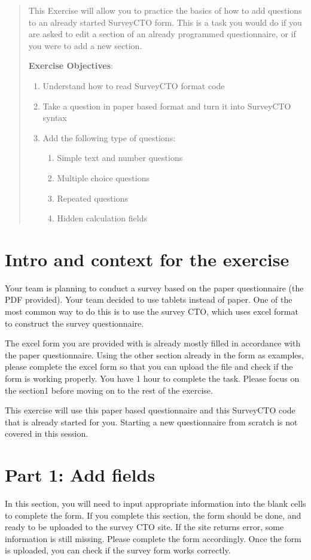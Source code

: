 \documentclass{tufte-handout}
\begin{document}
\begin{abstract}
This Exercise will allow you to practice the basics of how to add questions to an already started SurveyCTO form. This is a task you would do if you are asked to edit a section of an already programmed questionnaire, or if you were to add a new section.


\bigskip\noindent \textbf{Exercise Objectives}:
\begin{enumerate}
  \item Understand how to read SurveyCTO format code
  \item Take a question in paper based format and turn it into SurveyCTO syntax
  \item Add the following type of questions:
  \begin{enumerate}
  	\item Simple text and number questions
  	\item Multiple choice questions
  	\item Repeated questions
	\item Hidden calculation fields
  \end{enumerate}
\end{enumerate}
\end{abstract}

\section{Intro and context for the exercise}

Your team is planning to conduct a survey based on the paper questionnaire (the PDF provided). Your team decided to use tablets instead of paper. One of the most common way to do this is to use the survey CTO, which uses excel format to construct the survey questionnaire. 

The excel form you are provided with is already mostly filled in accordance with the paper questionnaire. Using the other section already in the form as examples, please complete the excel form so that you can upload the file and check if the form is working properly. You have 1 hour to complete the task. Please focus on the section1 before moving on to the rest of the exercise. 

This exercise will use this paper based questionnaire and this SurveyCTO code that is already started for you. Starting a new questionnaire from scratch is not covered in this session.

\section{Part 1: Add fields}
In this section, you will need to input appropriate information into the blank cells to complete the form. If you complete this section, the form should be done, and ready to be uploaded to the survey CTO site. If the site returns error, some information is still missing. Please complete the form accordingly. Once the form is uploaded, you can check if the survey form works correctly. 
\end{document}

